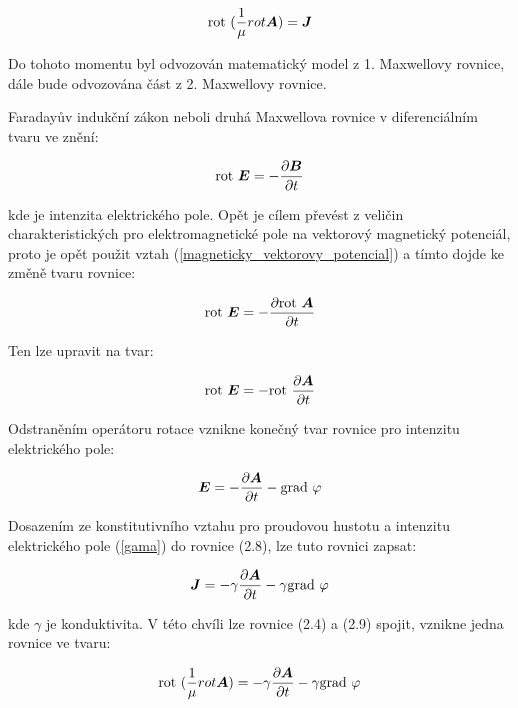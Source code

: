 \begin{equation}
 \mathrm{rot}\  (\frac{1}{\mu} {rot \mbox{\boldmath$A$}}) = \mbox{\boldmath$J$}
\end{equation}

Do tohoto momentu byl odvozován matematický model z 1. Maxwellovy rovnice, dále bude odvozována část z 2. Maxwellovy rovnice.
	
	Faradayův indukční zákon neboli druhá Maxwellova rovnice v diferenciálním tvaru ve znění:

\begin{equation}
	\mathrm{rot}\  \mbox{\boldmath$E$} = - \frac{\partial \mbox{\boldmath$B$}}{\partial t}
\end{equation}

kde  je intenzita elektrického pole. Opět je cílem převést z veličin charakteristických pro elektromagnetické pole na vektorový magnetický potenciál, proto je opět použit vztah (\ref{magneticky_vektorovy_potencial}) a tímto dojde ke změně tvaru rovnice:

\begin{equation}
	\mathrm{rot}\  \mbox{\boldmath$E$} = - \frac{\partial\mathrm{rot}\ \mbox{\boldmath$A$}}{\partial t}
\end{equation}

Ten lze upravit na tvar:

\begin{equation}
	\mathrm{rot}\  \mbox{\boldmath$E$} = - \mathrm{rot}\  \frac{\partial\mbox{\boldmath$A$}}{\partial t}
\end{equation}

Odstraněním operátoru rotace vznikne konečný tvar rovnice pro intenzitu elektrického pole:

\begin{equation}
	\mbox{\boldmath$E$} = - \frac{\partial \mbox{\boldmath$A$}}{\partial t} - \mathrm{grad}\ {\varphi}
\end{equation}

Dosazením ze konstitutivního vztahu pro proudovou hustotu  a intenzitu elektrického pole  (\ref{gama}) do rovnice (2.8), lze tuto rovnici zapsat:

\begin{equation}
	\mbox{\boldmath$J$} = - \gamma \frac{\partial \mbox{\boldmath$A$}}{\partial t} - \gamma \mathrm{grad}\ {\varphi}
\end{equation}

kde $\gamma$ je konduktivita. V této chvíli lze rovnice (2.4) a (2.9) spojit, vznikne jedna rovnice ve tvaru:

\begin{equation}
	\mathrm{rot}\  (\frac{1}{\mu} {rot \mbox{\boldmath$A$}}) = - \gamma \frac{\partial \mbox{\boldmath$A$}}{\partial t} - \gamma \mathrm{grad}\ {\varphi}
\end{equation}

